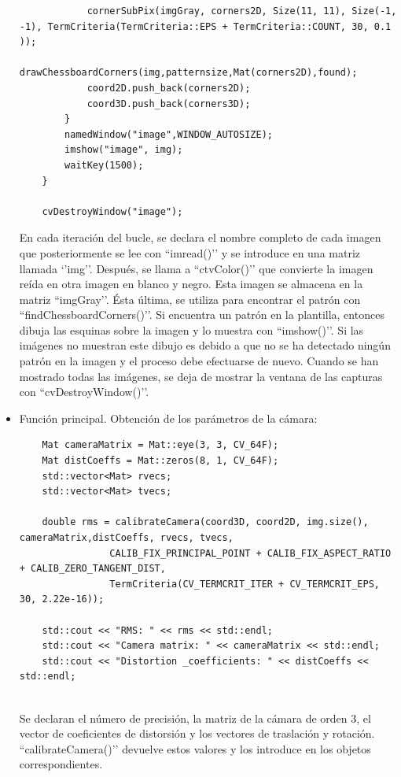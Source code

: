 \begin{itemize}
\begin{verbatim}
		    cornerSubPix(imgGray, corners2D, Size(11, 11), Size(-1, -1), TermCriteria(TermCriteria::EPS + TermCriteria::COUNT, 30, 0.1 ));
		    drawChessboardCorners(img,patternsize,Mat(corners2D),found);
		    coord2D.push_back(corners2D);
		    coord3D.push_back(corners3D);
	    } 
	    namedWindow("image",WINDOW_AUTOSIZE);
	    imshow("image", img);
	    waitKey(1500);
    }

    cvDestroyWindow("image");
    \end{verbatim}
    
En cada iteración del bucle, se declara el nombre completo de cada imagen que posteriormente se lee con ``imread()’’ y se introduce en una matriz llamada ‘’img’’. Después, se llama a ``ctvColor()’’ que convierte la imagen reída en otra imagen en blanco y negro. Esta imagen se almacena en la matriz ``imgGray’’. Ésta última, se utiliza para encontrar el patrón con ``findChessboardCorners()’’. Si encuentra un patrón en la plantilla, entonces dibuja las esquinas sobre la imagen y lo muestra con ``imshow()’’.  Si las imágenes no muestran este dibujo es debido a que no se ha detectado ningún patrón en la imagen y el proceso debe efectuarse de nuevo. Cuando se han mostrado todas las imágenes, se deja de mostrar la ventana de las capturas con ``cvDestroyWindow()’’.

    \item Función principal. Obtención de los parámetros de la cámara: \\
    
    \begin{verbatim} 
    Mat cameraMatrix = Mat::eye(3, 3, CV_64F);
    Mat distCoeffs = Mat::zeros(8, 1, CV_64F);
    std::vector<Mat> rvecs;
    std::vector<Mat> tvecs;
	
    double rms = calibrateCamera(coord3D, coord2D, img.size(), cameraMatrix,distCoeffs, rvecs, tvecs, 
				CALIB_FIX_PRINCIPAL_POINT + CALIB_FIX_ASPECT_RATIO + CALIB_ZERO_TANGENT_DIST,
				TermCriteria(CV_TERMCRIT_ITER + CV_TERMCRIT_EPS, 30, 2.22e-16));

    std::cout << "RMS: " << rms << std::endl;
    std::cout << "Camera matrix: " << cameraMatrix << std::endl;
    std::cout << "Distortion _coefficients: " << distCoeffs << std::endl;
	
    \end{verbatim} 
    
Se declaran el número de precisión, la matriz de la cámara de orden 3, el vector de coeficientes de distorsión y los vectores de traslación y rotación. ``calibrateCamera()’’ devuelve estos valores y los introduce en los objetos correspondientes. 


\end{itemize}
